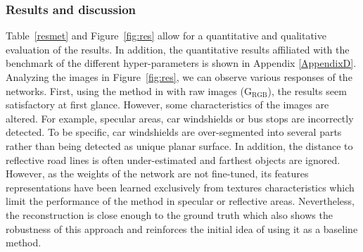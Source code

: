 \subsubsection{Results and discussion} 
Table~\ref{resmet} and Figure~\ref{fig:res} allow for a quantitative and qualitative evaluation of the results. In addition, the quantitative results affiliated with the benchmark of the different hyper-parameters is shown in Appendix \ref{AppendixD}.
Analyzing the images in Figure~\ref{fig:res}, we can observe various responses of the networks.
First, using the method in \cite{godard2019digging} with raw images (G$_{\textrm{RGB}}$), the results seem satisfactory at first glance. However, some characteristics of the images are altered. For example, specular areas, car windshields or bus stops are incorrectly detected. To be specific, car windshields are over-segmented into several parts rather than being detected as unique planar surface.
In addition, the distance to reflective road lines is often under-estimated and farthest objects are ignored.
However, as the weights of the network are not fine-tuned, its features representations have been learned exclusively from textures characteristics which limit the performance of the method in specular or reflective areas. 
Nevertheless, the reconstruction is close enough to the ground truth which also shows the robustness of this approach and reinforces the initial idea of using it as a baseline method.



